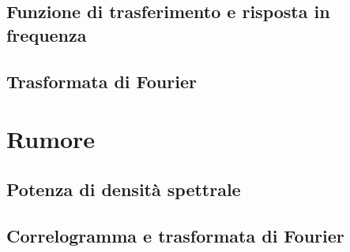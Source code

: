 \subsection{Funzione di trasferimento e risposta in frequenza}
\subsection{Trasformata di Fourier}

\section{Rumore}
\label{section 3.3}

\subsection{Potenza di densità spettrale}
\subsection{Correlogramma e trasformata di Fourier}

